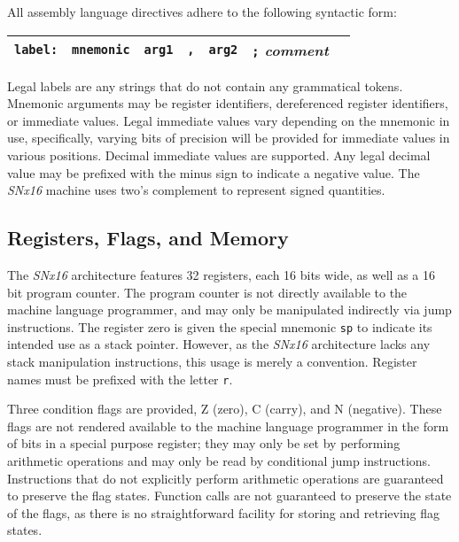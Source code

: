 \documentclass{article}
\begin{document}
All assembly language directives adhere to the following syntactic form:

\begin{center}
\begin{tabular}{|c|c|c|c|c|c|c|}
\hline
\texttt{label:} & \texttt{mnemonic} & \texttt{arg1} & \texttt{,} & \texttt{arg2} & \texttt{;} \emph{comment} \\ \hline
\end{tabular}
\end{center}

Legal labels are any strings that do not contain any grammatical tokens.
Mnemonic arguments may be register identifiers, dereferenced register
identifiers, or immediate values. Legal immediate values vary depending on the
mnemonic in use, specifically, varying bits of precision will be provided for
immediate values in various positions. Decimal immediate values are supported.
Any legal decimal value may be prefixed with the minus sign to indicate a
negative value. The \emph{SNx16} machine uses two's complement to represent
signed quantities.

\subsection{Registers, Flags, and Memory}

The \emph{SNx16} architecture features 32 registers, each 16 bits wide, as
well as a 16 bit program counter. The program counter is not directly available
to the machine language programmer, and may only be manipulated indirectly via
jump instructions. The register zero is given the special mnemonic \texttt{sp}
to indicate its intended use as a stack pointer. However, as the \emph{SNx16}
architecture lacks any stack manipulation instructions, this usage is merely a
convention. Register names must be prefixed with the letter \texttt{r}.

Three condition flags are provided, Z (zero), C (carry), and N (negative). These
flags are not rendered available to the machine language programmer in the form
of bits in a special purpose register; they may only be set by performing
arithmetic operations and may only be read by conditional jump instructions.
Instructions that do not explicitly perform arithmetic operations are guaranteed
to preserve the flag states. Function calls are not guaranteed to preserve the
state of the flags, as there is no straightforward facility for storing and
retrieving flag states.
\end{document}
